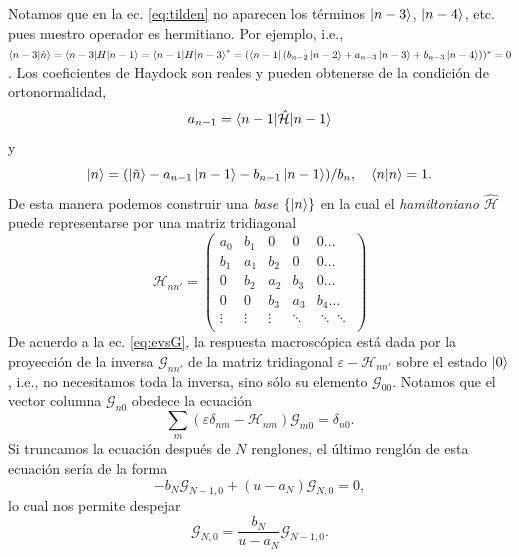 \documentclass[12pt]{article}
\begin{document}
Notamos que en la ec. \eqref{eq:tilden} no aparecen los términos
$\ket{n-3}$, $\ket{n-4}$, etc. pues nuestro operador es
hermitiano. Por ejemplo,
i.e., $\braket{n-3|\tilde
  n}=\braket{n-3|H|n-1} = \braket{n-1|H|n-3}^* =
(\bra{n-1}\left(b_{n-2}\ket{n-2} + a_{n-3}\ket{n-3}+b_{n-3}\ket{n-4}\right))^* = 0$.
Los coeficientes de Haydock son reales y pueden obtenerse de la condición de ortonormalidad,
\begin{equation}
  \label{eq:qn}
  a_{n-1}=\braket{n-1|\hat{\mathcal H}|n-1}
\end{equation}
y
\begin{equation}
  \label{eq:bn}
    \ket{n}=(\ket{\tilde n}-a_{n-1}\ket{n-1}-b_{n-1}\ket{n-1})/b_n,
    \quad \braket{n|n}=1.
\end{equation}
De esta manera podemos construir una {\em base} $\{\ket{n}\}$ en la
cual el {\em hamiltoniano} $\hat{\mathcal H}$ puede representarse por
una matriz tridiagonal
\begin{equation}
  \label{eq:trid}
  \mathcal H_{nn'}=
  \begin{pmatrix}
    a_0   &b_1   &0     &0     &0\ldots\\
    b_1   &a_1   &b_2   &0     &0\ldots\\
    0     &b_2   &a_2   &b_3   &0\ldots\\
    0     &0     &b_3   &a_3   &b_4\ldots\\
    \vdots&\vdots&\vdots&\ddots&\ddots\ddots\\
  \end{pmatrix}
\end{equation}
De acuerdo a la ec. \eqref{eq:evsG}, la respuesta macroscópica está
dada por la proyección de la inversa $\mathcal G_{nn'}$ de la matriz tridiagonal
$\varepsilon-\mathcal H_{nn'}$ sobre el estado $\ket{0}$, i.e., no
necesitamos toda la inversa, sino sólo su elemento $\mathcal G_{00}$.
Notamos que el vector columna $\mathcal G_{n0}$ obedece la ecuación
\begin{equation}
  \label{eq:Gn0}
  \sum_{m} (\varepsilon\delta_{nm}-\mathcal H_{nm})\mathcal G_{m0}=\delta_{n0}.
\end{equation}
Si truncamos la ecuación después de $N$ renglones, el último renglón
de esta ecuación sería de la forma
\begin{equation}
  \label{eq:GN}
  -b_N\mathcal G_{N-1,0} +(u-a_N)\mathcal G_{N,0}=0,
\end{equation}
lo cual nos permite despejar
\begin{equation}
  \label{eq:GN1}
  \mathcal G_{N,0}=\frac{b_N}{u-a_N}\mathcal G_{N-1,0}.
\end{equation}
\end{document}
